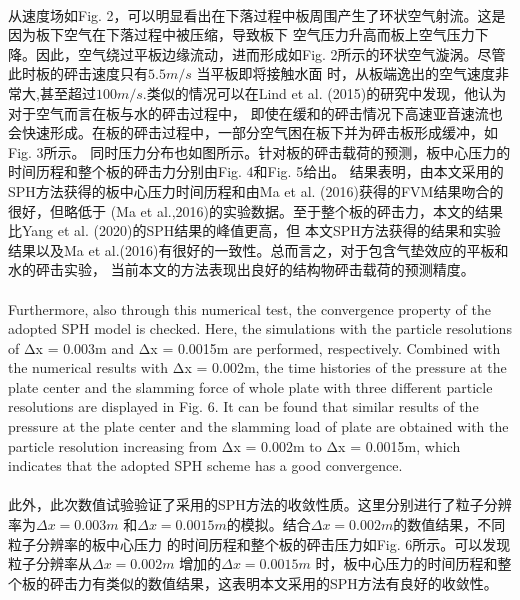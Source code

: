 \documentclass[UTF8]{ctexart}
\begin{document}
\paragraph{\quad}从速度场如Fig. 2，可以明显看出在下落过程中板周围产生了环状空气射流。这是因为板下空气在下落过程中被压缩，导致板下
            空气压力升高而板上空气压力下降。因此，空气绕过平板边缘流动，进而形成如Fig. 2所示的环状空气漩涡。尽管此时板的砰击速度只有$5.5m/s$
            当平板即将接触水面
            时，从板端逸出的空气速度非常大,甚至超过$100m/s$.类似的情况可以在Lind et al. (2015)的研究中发现，他认为对于空气而言在板与水的砰击过程中，
            即使在缓和的砰击情况下高速亚音速流也会快速形成。在板的砰击过程中，一部分空气困在板下并为砰击板形成缓冲，如Fig. 3所示。
            同时压力分布也如图所示。针对板的砰击载荷的预测，板中心压力的时间历程和整个板的砰击力分别由Fig. 4和Fig. 5给出。
            结果表明，由本文采用的SPH方法获得的板中心压力时间历程和由Ma et al. (2016)获得的FVM结果吻合的很好，但略低于
            (Ma et al.,2016)的实验数据。至于整个板的砰击力，本文的结果比Yang et al. (2020)的SPH结果的峰值更高，但
            本文SPH方法获得的结果和实验结果以及Ma et al.(2016)有很好的一致性。总而言之，对于包含气垫效应的平板和水的砰击实验，
            当前本文的方法表现出良好的结构物砰击载荷的预测精度。

\paragraph{\quad}Furthermore, also through this numerical test, the convergence property of the 
                adopted SPH model is checked. Here, the simulations with the particle resolutions 
                of Δx = 0.003m and Δx = 0.0015m are performed, respectively. Combined with the 
                numerical results with Δx = 0.002m, the time histories of the pressure at the plate 
                center and the slamming force of whole plate with three different particle resolutions 
                are displayed in Fig. 6. It can be found that similar results of the pressure at the 
                plate center and the slamming load of plate are obtained with the particle resolution 
                increasing from Δx = 0.002m to Δx = 0.0015m, which indicates that the adopted SPH 
                scheme has a good convergence.
\paragraph{\quad}此外，此次数值试验验证了采用的SPH方法的收敛性质。这里分别进行了粒子分辨率为$\Delta x = 0.003m$
                和$\Delta x = 0.0015m$的模拟。结合$\Delta x = 0.002 m$的数值结果，不同粒子分辨率的板中心压力
                的时间历程和整个板的砰击压力如Fig. 6所示。可以发现粒子分辨率从$\Delta x = 0.002m$ 增加的$\Delta x = 0.0015m$
                时，板中心压力的时间历程和整个板的砰击力有类似的数值结果，这表明本文采用的SPH方法有良好的收敛性。
\end{document}

